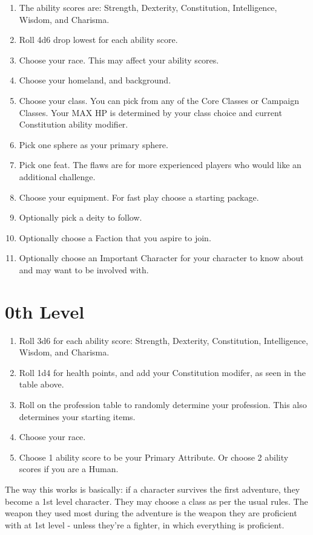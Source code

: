 \begin{multicols}{2}
\begin{enumerate}
    \item The ability scores are: Strength, Dexterity, Constitution, Intelligence, Wisdom, and Charisma. 
    \item Roll 4d6 drop lowest for each ability score.
    \item Choose your race. This may affect your ability scores. 
    \item Choose your homeland, and background.
    \item Choose your class. You can pick from any of the Core Classes or Campaign Classes. Your MAX HP is determined by your class choice and current Constitution ability modifier.
    \item Pick one sphere as your primary sphere.
    \item Pick one feat. The flaws are for more experienced players who would like an additional challenge.
    \item Choose your equipment. For fast play choose a starting package.
    \item Optionally pick a deity to follow. 
    \item Optionally choose a Faction that you aspire to join. 
    \item Optionally choose an Important Character for your character to know about and may want to be involved with. 
\end{enumerate}


\section{0th Level}

\begin{enumerate}
    \item Roll 3d6 for each ability score: Strength, Dexterity, Constitution, Intelligence, Wisdom, and Charisma.
    \item Roll 1d4 for health points, and add your Constitution modifer, as seen in the table above.
    \item Roll on the profession table to randomly determine your profession. This also determines your starting items.
    \item Choose your race. 
    \item Choose 1 ability score to be your Primary Attribute. Or choose 2 ability scores if you are a Human. 
\end{enumerate}

The way this works is basically: if a character survives the first adventure, they become a 1st level character. They may choose a class as per the usual rules. The weapon they used most during the adventure is the weapon they are proficient with at 1st level - unless they're a fighter, in which everything is proficient. 

\end{multicols}
